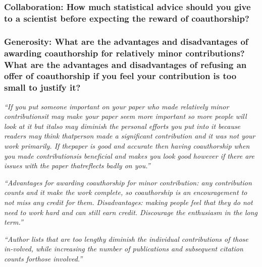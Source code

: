 \documentclass[12pt]{beamer}
\newcommand\ans[1]{{\it ``#1''}}
\newcommand\gap{\vspace{5mm}}
\begin{document}
\begin{frame}
\frametitle{Collaboration: How much statistical advice should you give to a scientist before expecting the reward of coauthorship?}



\end{frame} \begin{frame} %
  \frametitle{Generosity: What are the advantages and disadvantages of awarding coauthorship for relatively minor contributions? What are the advantages and disadvantages of refusing an offer of coauthorship if you feel your contribution is too small to justify it?}

  \ans{If you put someone important on your paper who made relatively minor contributionsit may make your paper seem more important so more people will look at it but italso may diminish the personal efforts you put into it because readers may think thatperson  made  a  significant  contribution  and  it  was  not  your  work  primarily.   If  thepaper is good and accurate then having coauthorship when you made contributionsis beneficial and makes you look good however if there are issues with the paper thatreflects badly on you.}
  
  \ans{Advantages for awarding coauthorship for minor contribution: any contribution counts and it make the work complete, so coauthorship is an encouragement to not miss any credit  for  them.   Disadvantages:  making  people  feel  that  they  do  not  need  to  work hard and can still earn credit.  Discourage the enthusiasm in the long term.}


  \ans{Author  lists  that  are  too  lengthy  diminish  the  individual  contributions  of  those  in-volved, while increasing the number of publications and subsequent citation counts forthose involved.}
  



\end{frame}
\end{document}
